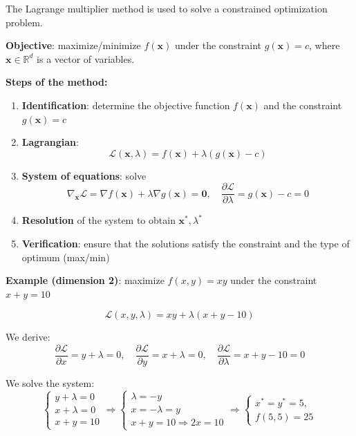 \begin{f}
	
	The Lagrange multiplier method is used to solve a constrained optimization problem.
	
	\textbf{Objective}: maximize/minimize \(f(\boldsymbol{x})\) under the constraint \(g(\boldsymbol{x}) = c\), where \(\boldsymbol{x} \in \mathbb{R}^d\) is a vector of variables.
	
	\textbf{Steps of the method:}
	\begin{enumerate}
		\item \textbf{Identification}: determine the objective function \(f(\boldsymbol{x})\) and the constraint \(g(\boldsymbol{x}) = c\)
		\item \textbf{Lagrangian}:
		\[
		\mathcal{L}(\boldsymbol{x}, \lambda) = f(\boldsymbol{x}) + \lambda (g(\boldsymbol{x}) - c)
		\]
		\item \textbf{System of equations}: solve
		\[
		\nabla_{\boldsymbol{x}} \mathcal{L} = \nabla f(\boldsymbol{x}) + \lambda \nabla g(\boldsymbol{x}) = \boldsymbol{0}, \quad
		\frac{\partial \mathcal{L}}{\partial \lambda} = g(\boldsymbol{x}) - c = 0
		\]
		\item \textbf{Resolution} of the system to obtain \(\boldsymbol{x}^*, \lambda^*\)
		\item \textbf{Verification}: ensure that the solutions satisfy the constraint and the type of optimum (max/min)
	\end{enumerate}
	
	\textbf{Example (dimension 2)}: maximize \(f(x, y) = xy\) under the constraint \(x + y = 10\)
	
	\[
	\mathcal{L}(x, y, \lambda) = xy + \lambda (x + y - 10)
	\]
	
	We derive:
	\[
	\frac{\partial \mathcal{L}}{\partial x} = y + \lambda = 0, \quad
	\frac{\partial \mathcal{L}}{\partial y} = x + \lambda = 0, \quad
	\frac{\partial \mathcal{L}}{\partial \lambda} = x + y - 10 = 0
	\]
	
	We solve the system:
\[
\begin{cases}
	y + \lambda = 0 \\
	x + \lambda = 0 \\
	x + y = 10
\end{cases}
\Rightarrow 
\begin{cases}
	\lambda = -y \\
	x = -\lambda = y \\
	x + y = 10 \Rightarrow 2x = 10 
\end{cases}
\Rightarrow 
	\begin{cases} 
		x^* =  y^*= 5,\\
		f(5,5) = 25
	\end{cases}
\]


\end{f}
